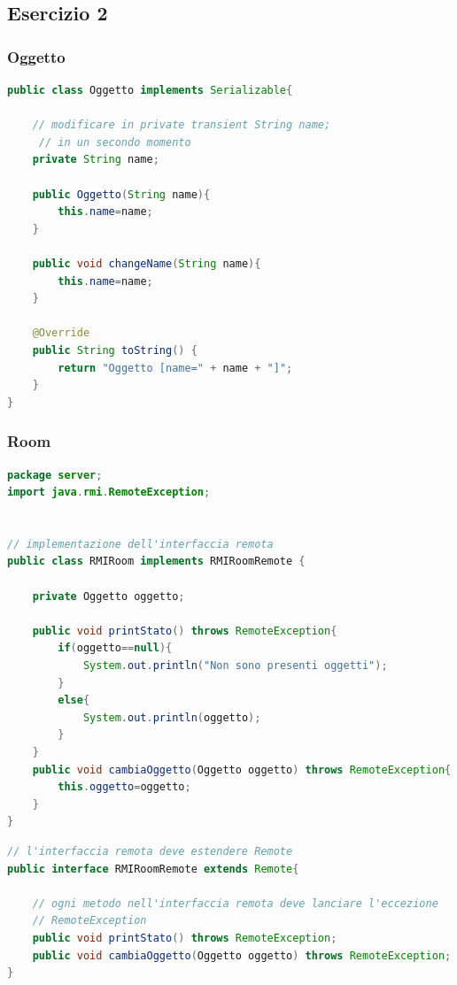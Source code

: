 \documentclass{article}
\begin{document}
\subsection{Esercizio 2}
\subsubsection{Oggetto}
\begin{lstlisting}[language=Java,escapechar=|]
public class Oggetto implements Serializable{

    // modificare in private transient String name;
	 // in un secondo momento
	private String name;
	
	public Oggetto(String name){
		this.name=name;
	}
	
	public void changeName(String name){
		this.name=name;
	}

	@Override
	public String toString() {
		return "Oggetto [name=" + name + "]";
	}
}
\end{lstlisting}

\subsubsection{Room}
\begin{lstlisting}[language=Java,escapechar=|]
package server;
import java.rmi.RemoteException;


// implementazione dell'interfaccia remota
public class RMIRoom implements RMIRoomRemote {

	private Oggetto oggetto;
	
	public void printStato() throws RemoteException{
		if(oggetto==null){
			System.out.println("Non sono presenti oggetti");
		}
		else{
			System.out.println(oggetto);
		}
	}
	public void cambiaOggetto(Oggetto oggetto) throws RemoteException{
		this.oggetto=oggetto;
	}
}
\end{lstlisting}

\begin{lstlisting}[language=Java,escapechar=|]
// l'interfaccia remota deve estendere Remote
public interface RMIRoomRemote extends Remote{

	// ogni metodo nell'interfaccia remota deve lanciare l'eccezione
	// RemoteException
	public void printStato() throws RemoteException;
	public void cambiaOggetto(Oggetto oggetto) throws RemoteException;
}
\end{lstlisting}
\end{document}

